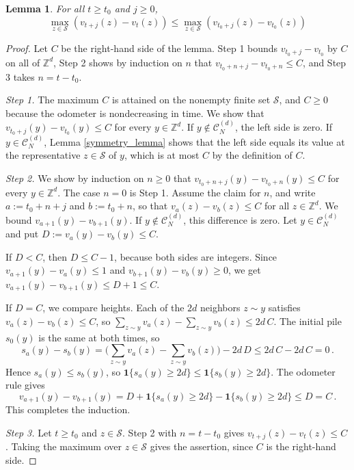 \documentclass[12pt]{amsart}
\newtheorem{lemma}[theorem]{Lemma}
\newcommand{\Z}{\mathbb{Z}}
\begin{document}
	\begin{lemma} \label{topple_limit}
	For all $t \geq t_0$ and $j \geq 0$, 
	\[
	\max_{z \in \mathcal{S}} \left( v_{t+j}(z) - v_t(z) \right) \leq \max_{z \in \mathcal{S}} \left( v_{t_0+j}(z) - v_{t_0}(z) \right)
	\]
	\end{lemma}

	
	\begin{proof}
Let $C$ be the right-hand side of the lemma. Step 1 bounds $v_{t_0+j}-v_{t_0}$ by $C$ on all of $\Z^d$, Step 2 shows by induction on $n$ that $v_{t_0+n+j}-v_{t_0+n}\leq C$, and Step 3 takes $n=t-t_0$.

\emph{Step 1.} The maximum $C$ is attained on the nonempty finite set $\mathcal S$, and $C\geq0$ because the odometer is nondecreasing in time. We show that $v_{t_0+j}(y)-v_{t_0}(y)\leq C$ for every $y\in\mathbb Z^d$. If $y\notin\mathcal C_N^{(d)}$, the left side is zero. If $y\in\mathcal C_N^{(d)}$, Lemma \ref{symmetry_lemma} shows that the left side equals its value at the representative $z\in\mathcal S$ of $y$, which is at most $C$ by the definition of $C$.

\emph{Step 2.} We show by induction on $n\geq0$ that $v_{t_0+n+j}(y)-v_{t_0+n}(y)\leq C$ for every $y\in\mathbb Z^d$. The case $n=0$ is Step 1. Assume the claim for $n$, and write $a:=t_0+n+j$ and $b:=t_0+n$, so that $v_a(z)-v_b(z)\leq C$ for all $z\in\mathbb Z^d$. We bound $v_{a+1}(y)-v_{b+1}(y)$. If $y\notin\mathcal C_N^{(d)}$, this difference is zero. Let $y\in\mathcal C_N^{(d)}$ and put $D:=v_a(y)-v_b(y)\leq C$.

If $D<C$, then $D\leq C-1$, because both sides are integers. Since $v_{a+1}(y)-v_a(y)\leq1$ and $v_{b+1}(y)-v_b(y)\geq0$, we get $v_{a+1}(y)-v_{b+1}(y)\leq D+1\leq C$.

If $D=C$, we compare heights. Each of the $2d$ neighbors $z\sim y$ satisfies $v_a(z)-v_b(z)\leq C$, so $\sum_{z\sim y}v_a(z)-\sum_{z\sim y}v_b(z)\leq 2d\,C$. The initial pile $s_0(y)$ is the same at both times, so
\begin{equation*}
s_a(y)-s_b(y)=\Big(\sum_{z\sim y}v_a(z)-\sum_{z\sim y}v_b(z)\Big)-2d\,D\leq 2d\,C-2d\,C=0\,.
\end{equation*}
Hence $s_a(y)\leq s_b(y)$, so $\mathbf 1\{s_a(y)\geq 2d\}\leq\mathbf 1\{s_b(y)\geq 2d\}$. The odometer rule gives
\begin{equation*}
v_{a+1}(y)-v_{b+1}(y)=D+\mathbf 1\{s_a(y)\geq 2d\}-\mathbf 1\{s_b(y)\geq 2d\}\leq D=C\,.
\end{equation*}
This completes the induction.

\emph{Step 3.} Let $t\geq t_0$ and $z\in\mathcal S$. Step 2 with $n=t-t_0$ gives $v_{t+j}(z)-v_t(z)\leq C$. Taking the maximum over $z\in\mathcal S$ gives the assertion, since $C$ is the right-hand side.
    \end{proof}
	
\end{document}
